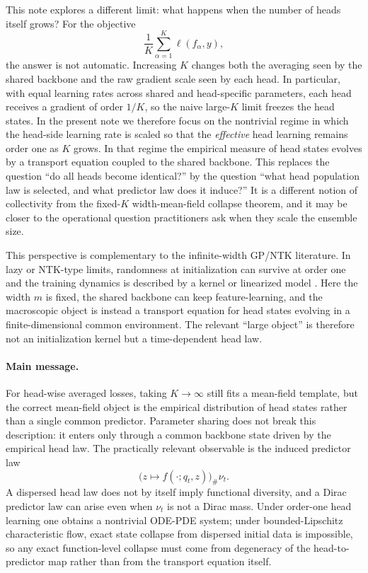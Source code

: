 \documentclass{article}
\theoremstyle{definition}
\begin{document}
This note explores a different limit: what happens when the number of heads itself grows? For the objective
\[
  \frac1K\sum_{\alpha=1}^K \ell(f_\alpha,y),
\]
the answer is not automatic. Increasing $K$ changes both the averaging seen by the shared backbone and the raw gradient scale seen by each head. In particular, with equal learning rates across shared and head-specific parameters, each head receives a gradient of order $1/K$, so the naive large-$K$ limit freezes the head states. In the present note we therefore focus on the nontrivial regime in which the head-side learning rate is scaled so that the \emph{effective} head learning remains order one as $K$ grows. In that regime the empirical measure of head states evolves by a transport equation coupled to the shared backbone. This replaces the question ``do all heads become identical?'' by the question ``what head population law is selected, and what predictor law does it induce?'' It is a different notion of collectivity from the fixed-$K$ width-mean-field collapse theorem, and it may be closer to the operational question practitioners ask when they scale the ensemble size.

This perspective is complementary to the infinite-width GP/NTK literature. In lazy or NTK-type limits, randomness at initialization can survive at order one and the training dynamics is described by a kernel or linearized model \citep{embedded-ensembles,chizat2019lazy,mei2019}. Here the width $m$ is fixed, the shared backbone can keep feature-learning, and the macroscopic object is instead a transport equation for head states evolving in a finite-dimensional common environment. The relevant ``large object'' is therefore not an initialization kernel but a time-dependent head law.

\paragraph{Main message.}
For head-wise averaged losses, taking $K\to\infty$ still fits a mean-field template, but the correct mean-field object is the empirical distribution of head states rather than a single common predictor. Parameter sharing does not break this description: it enters only through a common backbone state driven by the empirical head law. The practically relevant observable is the induced predictor law
\[
  \bigl(z\mapsto f(\cdot;q_t,z)\bigr)_{\#}\nu_t.
\]
A dispersed head law does not by itself imply functional diversity, and a Dirac predictor law can arise even when $\nu_t$ is not a Dirac mass. Under order-one head learning one obtains a nontrivial ODE-PDE system; under bounded-Lipschitz characteristic flow, exact state collapse from dispersed initial data is impossible, so any exact function-level collapse must come from degeneracy of the head-to-predictor map rather than from the transport equation itself.
\end{document}
